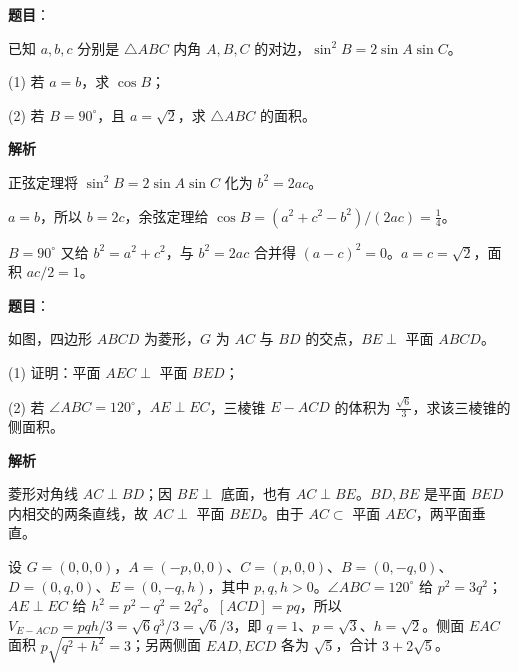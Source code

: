 \begin{answer}

\textbf{题目}：

已知 $a,b,c$ 分别是 $\triangle ABC$ 内角 $A,B,C$ 的对边，$\sin^2B=2\sin A\sin C$。

(1) 若 $a=b$，求 $\cos B$；

(2) 若 $B=90^\circ$，且 $a=\sqrt2$，求 $\triangle ABC$ 的面积。

\textbf{解析}

正弦定理将 $\sin^2B=2\sin A\sin C$ 化为 $b^2=2ac$。


$a=b$，所以 $b=2c$，余弦定理给 $\cos B=(a^2+c^2-b^2)/(2ac)=\frac14$。


$B=90^\circ$ 又给 $b^2=a^2+c^2$，与 $b^2=2ac$ 合并得 $(a-c)^2=0$。$a=c=\sqrt2$，面积 $ac/2=1$。



\end{answer}
\begin{answer}

\textbf{题目}：

如图，四边形 $ABCD$ 为菱形，$G$ 为 $AC$ 与 $BD$ 的交点，$BE\perp$ 平面 $ABCD$。

(1) 证明：平面 $AEC\perp$ 平面 $BED$；

(2) 若 $\angle ABC=120^\circ$，$AE\perp EC$，三棱锥 $E-ACD$ 的体积为 $\frac{\sqrt6}{3}$，求该三棱锥的侧面积。
\nopagebreak[4]
\begin{center}\end{center}
\nopagebreak[4]
\textbf{解析}


菱形对角线 $AC\perp BD$；因 $BE\perp$ 底面，也有 $AC\perp BE$。$BD,BE$ 是平面 $BED$ 内相交的两条直线，故 $AC\perp$ 平面 $BED$。由于 $AC\subset$ 平面 $AEC$，两平面垂直。


设 $G=(0,0,0)$，$A=(-p,0,0)$、$C=(p,0,0)$、$B=(0,-q,0)$、$D=(0,q,0)$、$E=(0,-q,h)$，其中 $p,q,h>0$。$\angle ABC=120^\circ$ 给 $p^2=3q^2$；$AE\perp EC$ 给 $h^2=p^2-q^2=2q^2$。$[ACD]=pq$，所以 $V_{E-ACD}=pqh/3=\sqrt6q^3/3=\sqrt6/3$，即 $q=1$、$p=\sqrt3$、$h=\sqrt2$。侧面 $EAC$ 面积 $p\sqrt{q^2+h^2}=3$；另两侧面 $EAD,ECD$ 各为 $\sqrt5$，合计 $3+2\sqrt5$。



\end{answer}
